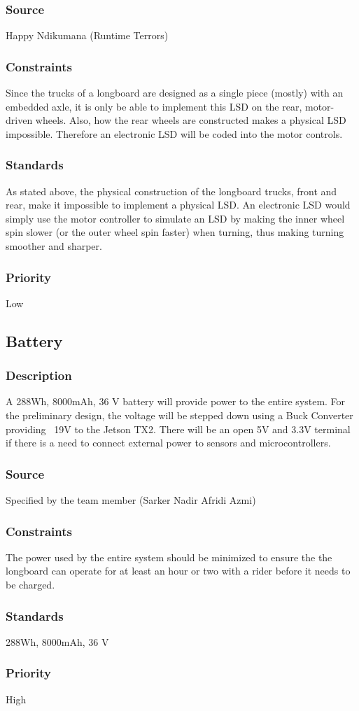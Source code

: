 \subsubsection{Source}
Happy Ndikumana (Runtime Terrors)
\subsubsection{Constraints}
Since the trucks of a longboard are designed as a single piece (mostly) with an embedded axle, it is only be able to implement this LSD on the rear, motor-driven wheels. Also, how the rear wheels are constructed makes a physical LSD impossible. Therefore an electronic LSD will be coded into the motor controls.
\subsubsection{Standards}
As stated above, the physical construction of the longboard trucks, front and rear, make it impossible to implement a physical LSD. An electronic LSD would simply use the motor controller to simulate an LSD by making the inner wheel spin slower (or the outer wheel spin faster) when turning, thus making turning smoother and sharper.
\subsubsection{Priority}
Low

\subsection{Battery}
\subsubsection{Description}
A 288Wh, 8000mAh, 36 V battery will provide power to the entire system. For the preliminary design, the voltage will be stepped down using a Buck Converter providing ~19V to the Jetson TX2. There will be an open 5V and 3.3V terminal if there is a need to connect external power to sensors and microcontrollers.
\subsubsection{Source}
Specified by the team member (Sarker Nadir Afridi Azmi)
\subsubsection{Constraints}
The power used by the entire system should be minimized to ensure the the longboard can operate for at least an hour or two with a rider before it needs to be charged.
\subsubsection{Standards}
288Wh, 8000mAh, 36 V
\subsubsection{Priority}
High
